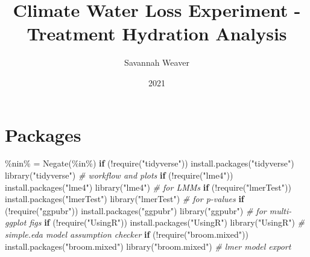 \documentclass[
]{article}
\title{Climate Water Loss Experiment - Treatment Hydration Analysis}
\author{Savannah Weaver}
\date{2021}
\newenvironment{Shaded}{\begin{snugshade}}{\end{snugshade}}
\newcommand{\AttributeTok}[1]{\textcolor[rgb]{0.77,0.63,0.00}{#1}}
\newcommand{\CommentTok}[1]{\textcolor[rgb]{0.56,0.35,0.01}{\textit{#1}}}
\newcommand{\ControlFlowTok}[1]{\textcolor[rgb]{0.13,0.29,0.53}{\textbf{#1}}}
\newcommand{\FunctionTok}[1]{\textcolor[rgb]{0.00,0.00,0.00}{#1}}
\newcommand{\NormalTok}[1]{#1}
\newcommand{\OtherTok}[1]{\textcolor[rgb]{0.56,0.35,0.01}{#1}}
\newcommand{\SpecialCharTok}[1]{\textcolor[rgb]{0.00,0.00,0.00}{#1}}
\newcommand{\StringTok}[1]{\textcolor[rgb]{0.31,0.60,0.02}{#1}}
\begin{document}
\maketitle

{
\setcounter{tocdepth}{3}
\tableofcontents
}
\hypertarget{packages}{%
\section{Packages}\label{packages}}

\begin{Shaded}
\begin{Highlighting}[]
\StringTok{\textasciigrave{}}\AttributeTok{\%nin\%}\StringTok{\textasciigrave{}} \OtherTok{=} \FunctionTok{Negate}\NormalTok{(}\StringTok{\textasciigrave{}}\AttributeTok{\%in\%}\StringTok{\textasciigrave{}}\NormalTok{)}
\ControlFlowTok{if}\NormalTok{ (}\SpecialCharTok{!}\FunctionTok{require}\NormalTok{(}\StringTok{"tidyverse"}\NormalTok{)) }\FunctionTok{install.packages}\NormalTok{(}\StringTok{"tidyverse"}\NormalTok{)}
\FunctionTok{library}\NormalTok{(}\StringTok{"tidyverse"}\NormalTok{) }\CommentTok{\# workflow and plots}
\ControlFlowTok{if}\NormalTok{ (}\SpecialCharTok{!}\FunctionTok{require}\NormalTok{(}\StringTok{"lme4"}\NormalTok{)) }\FunctionTok{install.packages}\NormalTok{(}\StringTok{"lme4"}\NormalTok{)}
\FunctionTok{library}\NormalTok{(}\StringTok{"lme4"}\NormalTok{) }\CommentTok{\# for LMMs}
\ControlFlowTok{if}\NormalTok{ (}\SpecialCharTok{!}\FunctionTok{require}\NormalTok{(}\StringTok{"lmerTest"}\NormalTok{)) }\FunctionTok{install.packages}\NormalTok{(}\StringTok{"lmerTest"}\NormalTok{)}
\FunctionTok{library}\NormalTok{(}\StringTok{"lmerTest"}\NormalTok{) }\CommentTok{\# for p{-}values}
\ControlFlowTok{if}\NormalTok{ (}\SpecialCharTok{!}\FunctionTok{require}\NormalTok{(}\StringTok{"ggpubr"}\NormalTok{)) }\FunctionTok{install.packages}\NormalTok{(}\StringTok{"ggpubr"}\NormalTok{)}
\FunctionTok{library}\NormalTok{(}\StringTok{"ggpubr"}\NormalTok{) }\CommentTok{\# for multi{-}ggplot figs}
\ControlFlowTok{if}\NormalTok{ (}\SpecialCharTok{!}\FunctionTok{require}\NormalTok{(}\StringTok{"UsingR"}\NormalTok{)) }\FunctionTok{install.packages}\NormalTok{(}\StringTok{"UsingR"}\NormalTok{)}
\FunctionTok{library}\NormalTok{(}\StringTok{"UsingR"}\NormalTok{) }\CommentTok{\# simple.eda model assumption checker}
\ControlFlowTok{if}\NormalTok{ (}\SpecialCharTok{!}\FunctionTok{require}\NormalTok{(}\StringTok{"broom.mixed"}\NormalTok{)) }\FunctionTok{install.packages}\NormalTok{(}\StringTok{"broom.mixed"}\NormalTok{)}
\FunctionTok{library}\NormalTok{(}\StringTok{"broom.mixed"}\NormalTok{) }\CommentTok{\# lmer model export}

\end{Highlighting}
\end{Shaded}
\end{document}
